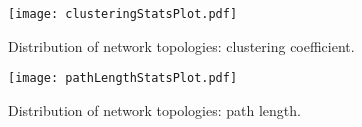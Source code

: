 

\begin{figure}[!htp]
\centering
\centerline{\texttt{[image: clusteringStatsPlot.pdf]}}
\caption{\label{fig:ch2:clusteringStats}Distribution of network topologies: clustering coefficient.}
\end{figure}



\begin{figure}[!htp]
\centering
\centerline{\texttt{[image: pathLengthStatsPlot.pdf]}}
\caption{\label{fig:ch2:pathLengthStats}Distribution of network topologies: path length.}
\end{figure}



